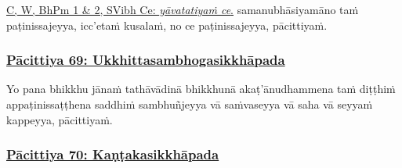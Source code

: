 {{{		\hypertarget{endnote360-appendix}{\hyperlink{endnote360-body}{C, W, BhPm 1 \& 2, SVibh Ce: \textit{yāvatatiyaṁ ce}.}}}}}\makeatother{} samanubhāsiyamāno taṁ paṭinissajeyya,\makeatletter\hyperlink{endnote361-appendix}\makeatother{} icc'etaṁ kusalaṁ, no ce paṭinissajeyya,\makeatletter\hyperlink{endnote362-appendix}\makeatother{} pācittiyaṁ.



\subsubsection*{\hyperref[exp69]{Pācittiya 69: Ukkhittasambhogasikkhāpada}}
\label{pac69}

Yo pana bhikkhu jānaṁ tathāvādinā bhikkhunā akaṭ'ānudhammena\makeatletter\hyperlink{endnote363-appendix}\makeatother{} taṁ diṭṭhiṁ appaṭinissaṭṭhena saddhiṁ sambhuñjeyya\makeatletter\hyperlink{endnote364-appendix}\makeatother{} vā saṁvaseyya\makeatletter\hyperlink{endnote365-appendix}\makeatother{} vā saha vā seyyaṁ kappeyya, pācittiyaṁ.



\subsubsection*{\hyperref[exp70]{Pācittiya 70: Kaṇṭakasikkhāpada}}
\label{pac70}

